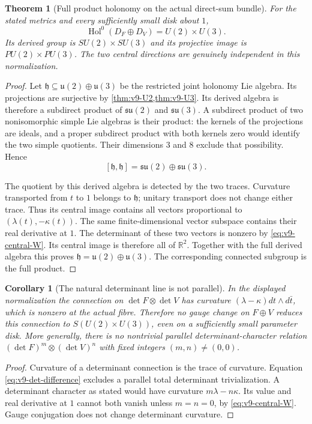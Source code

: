 \documentclass[11pt]{article}
\newtheorem{theorem}{Theorem}[section]
\newtheorem{corollary}[corollary]{Corollary}
\theoremstyle{definition}
\theoremstyle{remark}
\newcommand{\R}{\mathbb R}
\begin{document}
\begin{theorem}[Full product holonomy on the actual direct-sum bundle]
\label{thm:v9-joint-group}
For the stated metrics and every sufficiently small disk about $1$,
\begin{equation}
 \boxed{\operatorname{Hol}^0(D_F\oplus D_V)=U(2)\times U(3).}
 \label{eq:v9-product-group}
\end{equation}
Its derived group is $SU(2)\times SU(3)$ and its projective image is
$PU(2)\times PU(3)$. The two central directions are genuinely independent
in this normalization.
\end{theorem}
\begin{proof}
Let $\mathfrak h\subseteq\mathfrak u(2)\oplus\mathfrak u(3)$ be the
restricted joint holonomy Lie algebra. Its projections are surjective by
\cref{thm:v9-U2,thm:v9-U3}. Its derived algebra is therefore a subdirect
product of $\mathfrak{su}(2)$ and $\mathfrak{su}(3)$. A subdirect
product of two nonisomorphic simple Lie algebras is their product:
the kernels of the projections are ideals, and a proper subdirect product
with both kernels zero would identify the two simple quotients. Their
dimensions $3$ and $8$ exclude that possibility. Hence
\[
 [\mathfrak h,\mathfrak h]=\mathfrak{su}(2)\oplus\mathfrak{su}(3).
\]

The quotient by this derived algebra is detected by the two traces.
Curvature transported from $t$ to $1$ belongs to $\mathfrak h$;
unitary transport does not change either trace. Thus its central image
contains all vectors proportional to $(\lambda(t),-\kappa(t))$.
The same finite-dimensional vector subspace contains their real derivative
at $1$. The determinant of these two vectors is nonzero by
\cref{eq:v9-central-W}. Its central image is therefore all of $\R^2$.
Together with the full derived algebra this proves
$\mathfrak h=\mathfrak u(2)\oplus\mathfrak u(3)$.
The corresponding connected subgroup is the full product.
\end{proof}

\begin{corollary}[The natural determinant line is not parallel]
\label{cor:v9-no-det-reduction}
In the displayed normalization the connection on
$\det F\otimes\det V$ has curvature
$(\lambda-\kappa)dt\wedge d\bar t$, which is nonzero at the actual
fibre. Therefore no gauge change on $F\oplus V$ reduces this connection
to $S(U(2)\times U(3))$, even on a sufficiently small parameter disk.
More generally, there is no nontrivial parallel determinant-character
relation $(\det F)^m\otimes(\det V)^n$ with fixed integers $(m,n)\ne(0,0)$.
\end{corollary}
\begin{proof}
Curvature of a determinant connection is the trace of curvature. Equation
\cref{eq:v9-det-difference} excludes a parallel total determinant
trivialization. A determinant character as stated would have curvature
$m\lambda-n\kappa$. Its value and real derivative at $1$ cannot both
vanish unless $m=n=0$, by \cref{eq:v9-central-W}. Gauge conjugation does
not change determinant curvature.
\end{proof}
\end{document}
